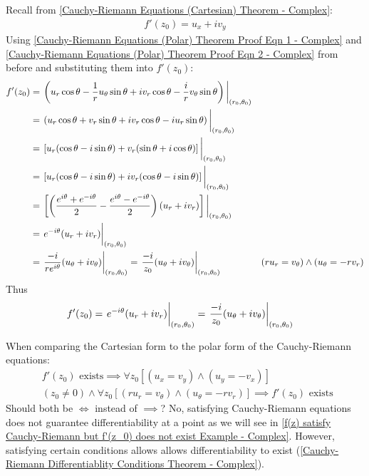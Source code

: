 \documentclass[12pt, english]{book}
\makeatletter
\renewenvironment{proof}[1][\proofname]{\par
	\pushQED{\qed}%
	\normalfont \topsep6\p@\@plus6\p@\relax
	\list{}{%
		\settowidth{\leftmargin}{\itshape\proofname:\hskip\labelsep}%
		\setlength{\labelwidth}{0pt}%
		\setlength{\itemindent}{-\leftmargin}%
		}%
	\item[\hskip\labelsep\itshape#1\@addpunct{:}]\ignorespaces
	}{\popQED\endlist\@endpefalse}
\makeatother
\begin{document}
\begin{proof}
		{\color{Grey}
			Recall from \cref{Cauchy-Riemann Equations (Cartesian) Theorem - Complex}:
			\begin{align*}
				f'(z_0) =  u_x + iv_y
			\end{align*}
			Using \cref{Cauchy-Riemann Equations (Polar) Theorem Proof Eqn 1 - Complex} and \cref{Cauchy-Riemann Equations (Polar) Theorem Proof Eqn 2 - Complex} from before and substituting them into \(f'(z_0)\):
			\begin{align*}
				f'(z_0) &= \eval{\left(u_r \cos\theta - \frac{1}{r}u_\theta \sin\theta + iv_r \cos\theta - \frac{i}{r} v_\theta \sin\theta \right)}_{(r_0, \theta_0)} \\
				&= \eval{\left(u_r \cos\theta + v_r \sin\theta + iv_r \cos\theta -iu_r \sin\theta \right)}_{(r_0, \theta_0)} \\
				&= \eval{\left[u_r(\cos\theta - i\sin\theta) + v_r(\sin\theta + i\cos\theta)\right]}_{(r_0,\theta_0)} \\
				&= \eval{\left[u_r(\cos\theta - i\sin\theta) + i v_r(\cos\theta - i\sin\theta)\right]}_{(r_0,\theta_0)} \\
				&= \eval{\left[\left(\frac{e^{i\theta} + e^{-i \theta}}{2} - \frac{e^{i\theta} - e^{-i \theta}}{2} \right)(u_r+iv_r)\right]}_{(r_0, \theta_0)} \\
				&= \eval{e^{-i\theta}(u_r + iv_r)}_{(r_0,\theta_0)} \\
				&= \eval{\frac{-i}{re^{i\theta}} (u_\theta + iv_\theta)}_{(r_0, \theta_0)}
				 = \eval{\frac{-i}{z_0} (u_\theta + iv_\theta)}_{(r_0, \theta_0)}
					& (ru_r = v_\theta) \land (u_\theta = -rv_r)
			\end{align*}
			Thus
			\begin{align*}
				f'(z_0) &= \eval{e^{-i\theta}(u_r + iv_r)}_{(r_0,\theta_0)} 
						 = \eval{\frac{-i}{z_0} (u_\theta + iv_\theta)}_{(r_0, \theta_0)}
			\end{align*}
		}
		
		
		
	\end{proof}

	\begin{question}
		When comparing the Cartesian form to the polar form of the Cauchy-Riemann equations:
		\begin{align*}
			&f'(z_0) \text{ exists} \implies \forall z_0[(u_x = v_y)\land(u_y = -v_x)] \\
			&(z_0 \neq 0) \land \forall z_0 [(ru_r = v_\theta) \land (u_\theta = -r v_r)]  
				\implies f'(z_0) \text{ exists }
		\end{align*}
		Should both be $\iff$ instead of $\implies$? 
		No, satisfying Cauchy-Riemann equations does not guarantee differentiability at a point as we will see in \cref{f(z) satisfy Cauchy-Riemann but f'(z_0) does not exist Example - Complex}. However, satisfying certain conditions allows allows differentiability to exist (\cref{Cauchy-Riemann Differentiablity Conditions Theorem - Complex}). 
	\end{question}
\end{document}
